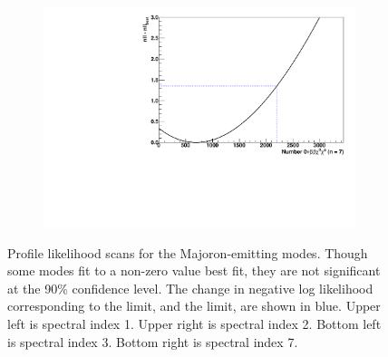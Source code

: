 \documentclass[herrin-thesis.tex]{subfiles}
\begin{document}
\begin{figure}[htbp]
\begin{subfigure}[c]{0.48\textwidth}
	\end{subfigure}\hfill%
	\begin{subfigure}[c]{0.48\textwidth}
	\centering
	\includegraphics[width=\textwidth]{./plots/analysis_bb0nX7_profile.pdf}
	\end{subfigure}
\caption[Profile likelihoods for \(0\nu\beta\beta\chi^0(\chi^0)\)]{Profile likelihood scans for the Majoron-emitting modes. Though some modes fit to a non-zero value best fit, they are not significant at the 90\% confidence level. The change in negative log likelihood corresponding to the limit, and the limit, are shown in blue. Upper left is spectral index 1. Upper right is spectral index 2. Bottom left is spectral index 3. Bottom right is spectral index 7.}
\label{fig:analysis_bb0nX_profiles}
\end{figure}
\end{document}
